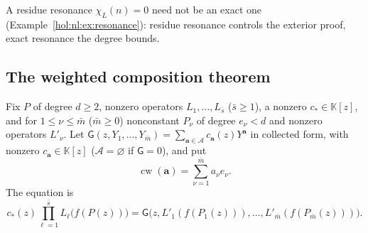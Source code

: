 \documentclass[11pt]{article}
\numberwithin{equation}{section}
\theoremstyle{definition}
\theoremstyle{remark}
\newcommand{\KK}{\mathbb K}
\begin{document}
A residue resonance $\chi_L(n)=0$ need not be an exact one
(Example~\ref{hol:nl:ex:resonance}): residue resonance controls the exterior
proof, exact resonance the degree bounds.

\subsection{The weighted composition theorem}\label{hol:pc:sub:weighted}

Fix $P$ of degree $d\ge2$, nonzero operators $L_1,\ldots,L_{\bar s}$ ($\bar
s\ge1$), a nonzero $c_*\in\KK[z]$, and for $1\le\nu\le\bar m$ ($\bar m\ge0$)
nonconstant $P_\nu$ of degree $e_\nu<d$ and nonzero operators $L'_\nu$. Let
$\mathsf G(z,Y_1,\ldots,Y_{\bar m})=\sum_{\mathbf a\in\mathcal A}c_{\mathbf
a}(z)Y^{\mathbf a}$ in collected form, with nonzero $c_{\mathbf a}\in\KK[z]$
($\mathcal A=\varnothing$ if $\mathsf G=0$), and put
\begin{equation}\label{hol:pc:eq:weight}
 \operatorname{cw}(\mathbf a)=\sum_{\nu=1}^{\bar m}a_\nu e_\nu .
\end{equation}
The equation is
\begin{equation}\label{hol:pc:eq:main}
 c_*(z)\prod_{\ell=1}^{\bar s}L_\ell\bigl(f(P(z))\bigr)
 =\mathsf G\bigl(z,L'_1(f(P_1(z))),\ldots,L'_{\bar m}(f(P_{\bar m}(z)))\bigr).
\end{equation}
\end{document}
